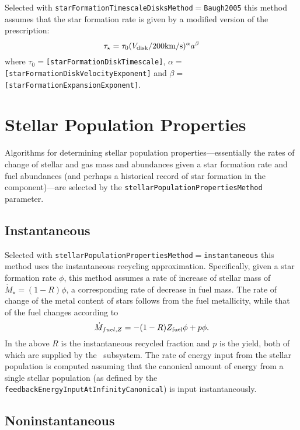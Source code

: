 Selected with {\tt starFormationTimescaleDisksMethod}$=${\tt Baugh2005} this method assumes that the star formation rate is given by a modified version of the \cite{baugh_can_2005} prescription:
\begin{equation}
\tau_\star = \tau_0 (V_{\rm disk}/200\hbox{km/s})^\alpha a^\beta
\end{equation}
where $\tau_0=${\tt [starFormationDiskTimescale]}, $\alpha=${\tt [starFormationDiskVelocityExponent]} and $\beta=${\tt [starFormationExpansionExponent]}.

\section{Stellar Population Properties}\label{sec:StellarPopulationProperties}

Algorithms for determining stellar population properties---essentially the rates of change of stellar and gas mass and abundances given a star formation rate and fuel abundances (and perhaps a historical record of star formation in the component)---are selected by the {\tt stellarPopulationPropertiesMethod} parameter.

\subsection{Instantaneous}

Selected with {\tt stellarPopulationPropertiesMethod}$=${\tt instantaneous} this method uses the instantaneous recycling approximation. Specifically, given a star formation rate $\phi$, this method assumes a rate of increase of stellar mass of $\dot{M}_\star=(1-R)\phi$, a corresponding rate of decrease in fuel mass. The rate of change of the metal content of stars follows from the fuel metallicity, while that of the fuel changes according to
\begin{equation}
 \dot{M}_{fuel,Z} = - (1-R) Z_{\rm fuel} \phi + p \phi.
\end{equation}
In the above $R$ is the instantaneous recycled fraction and $p$ is the yield, both of which are supplied by the \IMF\ subsystem. The rate of energy input from the stellar population is computed assuming that the canonical amount of energy from a single stellar population (as defined by the {\tt feedbackEnergyInputAtInfinityCanonical}) is input instantaneously.

\subsection{Noninstantaneous}

